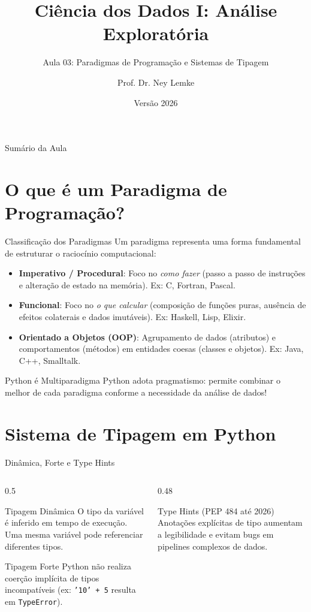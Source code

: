 \documentclass[aspectratio=169, 10pt]{beamer}
\title[Aula 03 - Paradigmas e Tipos]{Ciência dos Dados I: Análise Exploratória}
\subtitle{Aula 03: Paradigmas de Programação e Sistemas de Tipagem}
\author{Prof. Dr. Ney Lemke}
\institute{UNESP -- Instituto de Biociências de Botucatu}
\date{Versão 2026}
\begin{document}
\frame{\titlepage}

\begin{frame}{Sumário da Aula}
  \tableofcontents
\end{frame}

\section{O que é um Paradigma de Programação?}

\begin{frame}{Classificação dos Paradigmas}
  Um paradigma representa uma forma fundamental de estruturar o raciocínio computacional:
  \begin{itemize}
    \item \textbf{Imperativo / Procedural}: Foco no \textit{como fazer} (passo a passo de instruções e alteração de estado na memória). Ex: C, Fortran, Pascal.
    \item \textbf{Funcional}: Foco no \textit{o que calcular} (composição de funções puras, ausência de efeitos colaterais e dados imutáveis). Ex: Haskell, Lisp, Elixir.
    \item \textbf{Orientado a Objetos (OOP)}: Agrupamento de dados (atributos) e comportamentos (métodos) em entidades coesas (classes e objetos). Ex: Java, C++, Smalltalk.
  \end{itemize}
  \begin{block}{Python é Multiparadigma}
    Python adota pragmatismo: permite combinar o melhor de cada paradigma conforme a necessidade da análise de dados!
  \end{block}
\end{frame}

\section{Sistema de Tipagem em Python}

\begin{frame}{Dinâmica, Forte e Type Hints}
  \begin{columns}
    \begin{column}{0.5\textwidth}
      \begin{block}{Tipagem Dinâmica}
        O tipo da variável é inferido em tempo de execução. Uma mesma variável pode referenciar diferentes tipos.
      \end{block}
      \begin{block}{Tipagem Forte}
        Python não realiza coerção implícita de tipos incompatíveis (ex: \texttt{'10' + 5} resulta em \texttt{TypeError}).
      \end{block}
    \end{column}
    \begin{column}{0.48\textwidth}
      \begin{block}{Type Hints (PEP 484 até 2026)}
        Anotações explícitas de tipo aumentam a legibilidade e evitam bugs em pipelines complexos de dados.
      \end{block}
    \end{column}
  \end{columns}
\end{frame}
\end{document}
